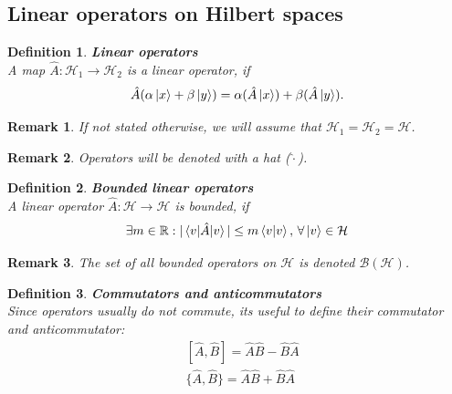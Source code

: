 \documentclass[12pt, a4paper,  nobibnotes]{article}
\newtheorem{definition}{Definition}
\newtheorem{remark}{Remark}
\begin{document}
\subsection{Linear operators on Hilbert spaces}

\begin{definition}
    \textbf{Linear operators}\\
    A map $\hat A: \mathcal H_1 \rightarrow \mathcal H_2$ is a linear operator, if 
    \begin{equation*}
        \hat A (\alpha\ket x + \beta\ket y) = \alpha (\hat A \ket x) + \beta (\hat A \ket y).
    \end{equation*}
\end{definition}

\begin{remark}
    If not stated otherwise, we will assume that $\mathcal H_1 = \mathcal H_2 = \mathcal H$.
\end{remark}

\begin{remark}
    Operators will be denoted with a hat ($\hat{\cdot}$).
\end{remark}

\begin{definition}
    \textbf{Bounded linear operators}\\
    A linear operator $\hat A: \mathcal H \rightarrow \mathcal H$ is bounded, if 
    \begin{equation*}
        \exists m \in \mathbb R : |\braket{v|\hat A | v}| \leq m\braket{v|v},\, \forall \ket v \in \mathcal H
    \end{equation*}
\end{definition}

\begin{remark}
    The set of all bounded operators on $\mathcal H$ is denoted $\mathcal{B(H)}$.
\end{remark}


\begin{definition}
    \textbf{Commutators and anticommutators}\\
    Since operators usually do not commute, its useful to define their commutator and anticommutator:
    \begin{align*}
        &[\hat A, \hat B] = \hat A\hat B - \hat B\hat A\\
        &\{\hat A, \hat B\} = \hat A\hat B + \hat B\hat A
    \end{align*}
\end{definition}
\end{document}
